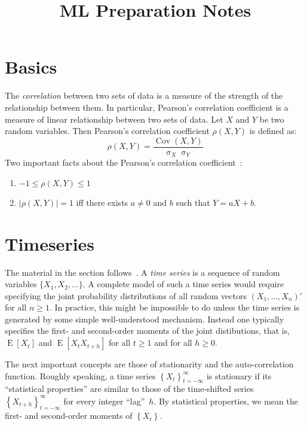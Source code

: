 \documentclass[11pt,a4]{article}
\title{ML Preparation Notes}
\DeclareMathOperator{\cov}{Cov}
\DeclareMathOperator{\sd}{\sigma}
\DeclareMathOperator{\E}{E}
\newcommand{\ts}[3]{\ensuremath{\left \{ #1 \right \}_{#2}^{#3}}}
\begin{document}
\maketitle

\section{Basics}

The \emph{correlation} between two sets of data is a measure of the strength of the relationship between them. In particular, Pearson's correlation coefficient 
is a measure of linear relationship between two sets of data. Let $X$ and $Y$ 
be two random variables. Then Pearson's correlation coefficient $\rho(X, Y)$ 
is defined as:
\begin{equation}
	\rho(X, Y) = \frac{\cov(X, Y)}{\sd_X \sd_Y} 
\end{equation}  
Two important facts about the Pearson's correlation coefficient~\cite{CasBer}:
\begin{enumerate}
	\item $-1 \leq \rho(X, Y) \leq 1$
	\item $|\rho(X, Y)| = 1$ iff there exists $a \neq 0$ and $b$ such that 
	$Y = aX + b$.
\end{enumerate}


\section{Timeseries}

The material in the section follows~\cite{BroDav}. A \emph{time series} is a 
sequence of random variables $\{X_1, X_2, \ldots \}$. A complete model of such 
a time series would require specifying the joint probability distributions 
of all random vectors $(X_1, \ldots, X_n)'$ for all $n \geq 1$. In practice, 
this might be impossible to do unless the time series is generated by some 
simple well-understood mechanism. Instead one typically specifies the first- and 
second-order moments of the joint distibutions, that is, $\E[X_t]$ and $\E[X_t X_{t + h}]$ for all $t \geq 1$ and for all $h \geq 0$. 

The next important concepts are those of stationarity and the 
auto-correlation function. Roughly speaking, a time series 
$\ts{X_t}{t = -\infty}{\infty}$ is stationary if its ``statistical properties'' are similar to those of the time-shifted series $\ts{X_{t + h}}{t = -\infty}{\infty}$ for every integer ``lag''~$h$. By statistical properties, we mean 
the first- and second-order moments of $\ts{X_t}{}{}$. 
\end{document}
